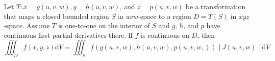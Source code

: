 \documentclass[../calc3.tex]{subfiles}
\begin{document}
\begin{theorem}
    Let $T:x=g(u,v,w), y=h(u,v,w)$, and $z=p(u,v,w)$ be a transformation that maps a closed 
    bounded region $S$ in $uvw$-space to a region $D=T(S)$ in $xyz$-space. Assume $T$ is one-to-one 
    on the interior of $S$ and $g$, $h$, and $p$ have continuous first partial derivatives there. 
    If $f$ is continuous on $D$, then 
    \[\iiint_D f(x,y,z)\mathrm{d}V = \iiint_S f(g(u,v,w),h(u,v,w),p(u,v,w,))\mid J(u,v,w)\mid \mathrm{d}V\]
\end{theorem}
\end{document}
